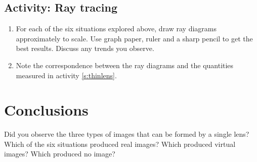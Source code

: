 \subsection{Activity: Ray tracing}
\begin{enumerate}
	\item For each of the six situations explored above, draw ray diagrams approximately to scale. Use graph paper, ruler and a sharp pencil to get the best results. Discuss any trends you observe. 
	\item Note the correspondence between the ray diagrams and the quantities measured in activity \ref{s:thinlens}.
\end{enumerate}

\section{Conclusions}
Did you observe the three types of images that can be formed by a single lens? Which of the six situations produced real images? Which produced virtual images? Which produced no image?  


 
\endinput

